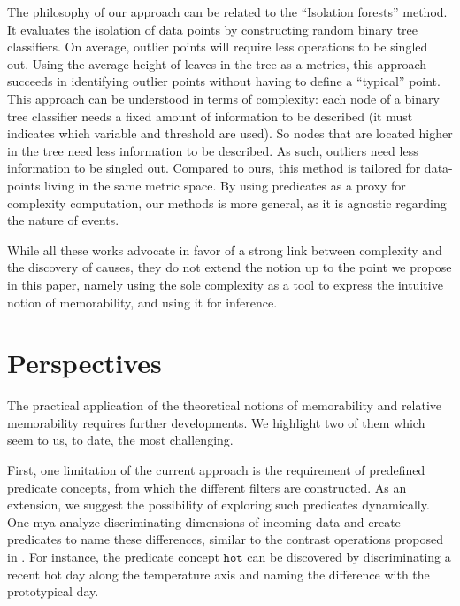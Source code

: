 \documentclass[entropy,article,submit,moreauthors,pdftex]{Definitions/mdpi}
\begin{document}
The philosophy of our approach can be related to the ``Isolation forests'' method\cite{liu_isolation_2008,hariri_extended_2021}. It evaluates the isolation of data points by constructing random binary tree classifiers. On average, outlier points will require less operations to be singled out. Using the average height of leaves in the tree as a metrics, this approach succeeds in identifying outlier points without having to define a ``typical'' point. This approach can be understood in terms of complexity: each node of a binary tree classifier needs a fixed amount of information to be described (it must indicates which variable and threshold are used). So nodes that are located higher in the tree need less information to be described. As such, outliers need less information to be singled out. Compared to ours, this method is tailored for data-points living in the same metric space. By using predicates as a proxy for complexity computation, our methods is more general, as it is agnostic regarding the nature of events.

While all these works advocate in favor of a strong link between complexity and the
discovery of causes, they do not extend the notion up to the point we propose in this paper, namely using the sole complexity as a tool to express the intuitive notion of memorability, and using it for inference.

\section{Perspectives}
\label{sec:future}

The practical application of the theoretical notions of memorability and relative memorability requires further developments. We highlight two of them which seem to us, to date, the most challenging.


First, one limitation of the current approach is the requirement of
predefined predicate concepts, from which the different filters are constructed.
As an extension, we suggest the possibility of exploring such predicates dynamically.
One mya analyze discriminating
dimensions of incoming data and create predicates to name these differences,
similar to the contrast operations proposed in \cite{dessalles_conceptual_2015,
    gardenfors2004conceptual}. For instance, the predicate concept $\mathtt{hot}$
can be discovered by discriminating a recent hot day along the
temperature axis and naming the difference with the prototypical day.
\end{document}
